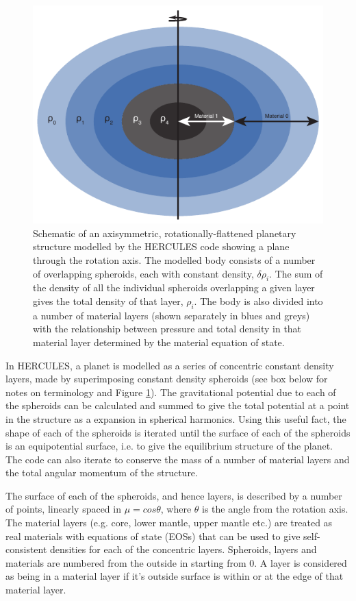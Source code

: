 \documentclass[11pt, oneside]{article}   	%
\begin{document}
\begin{figure}[h!]
   \centering
   \includegraphics{Figures/HERCULES_schematic.pdf} 
   \caption{Schematic of an axisymmetric, rotationally-flattened planetary structure modelled by the HERCULES code showing a plane through the rotation axis. The modelled body consists of a number of overlapping spheroids, each with constant density, $\delta \rho_i$. The sum of the density of all the individual spheroids overlapping a given layer gives the total density of that layer, $\rho_i$. The body is also divided into a number of material layers (shown separately in blues and greys) with the relationship between pressure and total density in that material layer determined by the material equation of state.}
   \label{fig:schematic}
\end{figure}

In HERCULES, a planet is modelled as a series of concentric constant density layers, made by superimposing constant density spheroids (see box below for notes on terminology and Figure \ref{fig:schematic}).
The gravitational potential due to each of the spheroids can be calculated and summed to give the total potential at a point in the structure as a expansion in spherical harmonics.
Using this useful fact, the shape of each of the spheroids is iterated until the surface of each of the spheroids is an equipotential surface, i.e. to give the equilibrium structure of the planet.
The code can also iterate to conserve the mass of a number of material layers and the total angular momentum of the structure.

The surface of each of the spheroids, and hence layers, is described by a number of points, linearly spaced in $\mu=cos\theta $, where $\theta$ is the angle from the rotation axis.
The material layers (e.g. core, lower mantle, upper mantle etc.) are treated as real materials with equations of state (EOSs) that can be used to give self-consistent densities for each of the concentric layers.  
Spheroids, layers and materials are numbered from the outside in starting from $0$.
A layer is considered as being in a material layer if it's outside surface is within or at the edge of that material layer.
\end{document}

